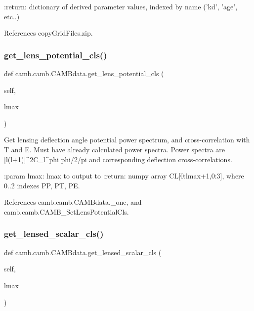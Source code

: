 \begin{DoxyVerb}:return: dictionary of derived parameter values, indexed by name ('kd', 'age', etc..)
\end{DoxyVerb}
 

References copy\+Grid\+Files.\+zip.

\mbox{\label{classcamb_1_1camb_1_1CAMBdata_a4afbb696ceabc6414275667983733d96}} 
\subsubsection{\texorpdfstring{get\+\_\+lens\+\_\+potential\+\_\+cls()}{get\_lens\_potential\_cls()}}
{\footnotesize\ttfamily def camb.\+camb.\+C\+A\+M\+Bdata.\+get\+\_\+lens\+\_\+potential\+\_\+cls (\begin{DoxyParamCaption}\item[{}]{self,  }\item[{}]{lmax }\end{DoxyParamCaption})}

\begin{DoxyVerb}Get lensing deflection angle potential power spectrum, and cross-correlation with T and E. Must have already calculated power spectra.
Power spectra are [l(l+1)]^2C_l^{phi phi}/2/pi and corresponding deflection cross-correlations.

:param lmax: lmax to output to
:return: numpy array CL[0:lmax+1,0:3], where 0..2 indexes PP, PT, PE.
\end{DoxyVerb}
 

References camb.\+camb.\+C\+A\+M\+Bdata.\+\_\+one, and camb.\+camb.\+C\+A\+M\+B\+\_\+\+Set\+Lens\+Potential\+Cls.

\mbox{\label{classcamb_1_1camb_1_1CAMBdata_a025677b02513d9fe4c19676203f72e8c}} 
\subsubsection{\texorpdfstring{get\+\_\+lensed\+\_\+scalar\+\_\+cls()}{get\_lensed\_scalar\_cls()}}
{\footnotesize\ttfamily def camb.\+camb.\+C\+A\+M\+Bdata.\+get\+\_\+lensed\+\_\+scalar\+\_\+cls (\begin{DoxyParamCaption}\item[{}]{self,  }\item[{}]{lmax }\end{DoxyParamCaption})}

